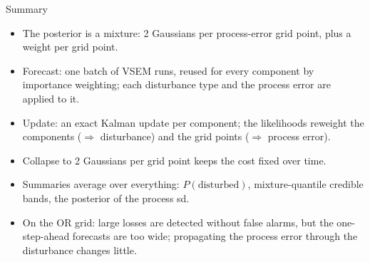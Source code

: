 \documentclass[aspectratio=169,12pt]{beamer}
\begin{document}
\begin{frame}{Summary}
  \begin{itemize}
    \item The posterior is a mixture: 2 Gaussians per process-error grid point, plus a weight per grid point.
    \item Forecast: one batch of VSEM runs, reused for every component by importance weighting;
          each disturbance type and the process error are applied to it.
    \item Update: an exact Kalman update per component; the likelihoods reweight the components
          (\(\Rightarrow\) disturbance) and the grid points (\(\Rightarrow\) process error).
    \item Collapse to 2 Gaussians per grid point keeps the cost fixed over time.
    \item Summaries average over everything: $P(\text{disturbed})$, mixture-quantile credible bands,
          the posterior of the process sd.
    \item On the OR grid: large losses are detected without false alarms, but the one-step-ahead
          forecasts are too wide; propagating the process error through the disturbance changes little.
  \end{itemize}
\end{frame}
\end{document}
